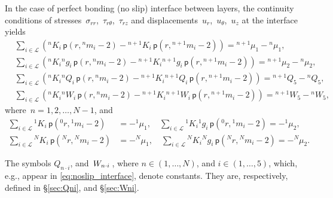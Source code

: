 \documentclass[preprint,12pt,times,draft]{elsarticle}
\numberwithin{equation}{section}
\newcommand{\pr}[1]{\left( #1 \right)}
\newcommand{\p}{\,\mathsf{p}}
\newcommand{\Qsub}[2]{Q_{#1\cdot #2}}
\newcommand{\Wsub}[2]{
\IfEqCase{#2}{
      {i}{\, W_{#1\cdot #2}\,}%
  }[\,W_{#1\cdot {\scriptscriptstyle #2}}\,]}
\newcommand{\infive}{\in(1,\ldots,5)}
\newcommand{\inN}{\in(1,\ldots,N)}
\renewcommand{\>}{$\Rightarrow$}
\begin{document}
In the case of perfect bonding (no slip) interface between layers, the continuity conditions of stresses~$\sigma_{rr}$,~$\tau_{r\theta}$,~$\tau_{rz}$ and displacements~$u_{r}$,~$u_{\theta}$,~$u_z$ at the interface yields
\begin{subequations}
	\begin{align}
	& \sum_{i \in \mathcal{L}} \left( {}^{n}\!{K_{i}} \p\pr{r,{}^{n}\!{m_{i}} - 2} - {}^{n+1}\!{K_{i}} \p\pr{r,{}^{n+1}\!{m_{i}} - 2} \right) = {}^{n+1}\!{\mu_{1}}
  - {}^{n}\!{\mu_{1}}, \\
	& \sum_{i \in \mathcal{L}} \left( {}^{n}\!{K_{i}} {}^{n}\!{g_{i}} \p\pr{r,{}^{n}\!{m_{i}} - 2} - {}^{n+1}\!{K_{i}} {}^{n+1}\!{g_{i}} \p\pr{r,{}^{n+1}\!{m_{i}} - 2} \right) = {}^{n+1}\!{\mu_{2}} - {}^{n}\!{\mu_{2}}, \\
	& \sum_{i \in \mathcal{L}} \left( {}^{n}\!{K_{i}} {}^{n}\!{Q_{i}} \p\pr{r,{}^{n}\!{m_{i}} - 2} - {}^{n+1}\!{K_{i}} {}^{n+1}\!{Q_{i}} \p\pr{r,{}^{n+1}\!{m_{i}} - 2} \right) = {}^{n+1}\!{Q_{5}} - {}^{n}\!{Q_{5}}, \\
	& \sum_{i \in \mathcal{L}} \left( {}^{n}\!{K_{i}} {}^{n}\!{W_{i}} \p\pr{r,{}^{n}\!{m_{i}} - 2} - {}^{n+1}\!{K_{i}} {}^{n+1}\!{W_{i}} \p\pr{r,{}^{n+1}\!{m_{i}} - 2} \right) = {}^{n+1}\!{W_{5}} - {}^{n}\!{W_{5}},
	\end{align}
	\label{eq:noslip_interface}
\end{subequations}
where~$n = 1,2,\dots,N-1$, and
\begin{subequations}
	\begin{align}
	\sum_{i \in \mathcal{L}} {}^{1}\!{K_{i}} \p\pr{{}^{0}\!{r},{}^{1}\!{m_{i}} - 2} & = -{}^{1}\!{\mu_{1}}, \quad
	\sum_{i \in \mathcal{L}} {}^{1}\!{K_{i}} {}^{1}\!{g_{i}} \p\pr{{}^{0}\!{r},{}^{1}\!{m_{i}} - 2} = -{}^{1}\!{\mu_{2}},\\
	\sum_{i \in \mathcal{L}} {}^{N}\!{K_{i}} \p\pr{{}^{N}\!{r},{}^{N}\!{m_{i}} - 2} & = -{}^{N}\!{\mu_{1}}, \quad
	\sum_{i \in \mathcal{L}} {}^{N}\!{K_{i}} {}^{N}\!{g_{i}} \p\pr{{}^{N}\!{r},{}^{N}\!{m_{i}} - 2} = -{}^{N}\!{\mu_{2}}.
	\end{align}
	\label{eq:boundary}
\end{subequations}


The symbols $\Qsub{n}{i}$, and $\Wsub{n}{i}$, where $n\inN$, and $i\infive$, which, e.g., appear in \eqref{eq:noslip_interface}, denote constants. They are, respectively, defined in \S\ref{sec:Qni}, and \S\ref{sec:Wni}.

\end{document}
